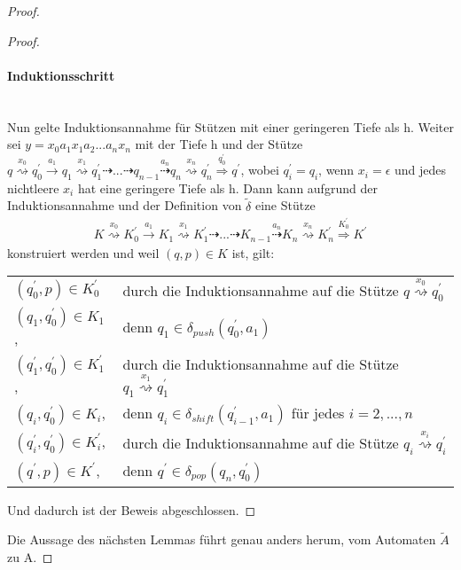 \begin{proof}
\begin{proof}
\paragraph{Induktionsschritt}\ \\
Nun gelte Induktionsannahme für Stützen mit einer geringeren Tiefe als h. Weiter sei $y = x_0a_1x_1a_2...a_nx_n$ mit der Tiefe h und der Stütze $q \stackrel{x_0}{\rightsquigarrow} q_0^{\prime} \stackrel{a_1}{\rightarrow} q_1\stackrel{x_1}{\rightsquigarrow} q_1^{\prime} \dashrightarrow ... \dashrightarrow q_{n-1} \stackrel{a_n}{\dashrightarrow} q_n \stackrel{x_n}{\rightsquigarrow} q_n^{\prime} \stackrel {q_0^{\prime}} {\Rightarrow} q^\prime$, wobei $q_i^\prime = q_i$, wenn $x_i = \epsilon$ und jedes nichtleere $x_i$ hat eine geringere Tiefe als h. Dann kann aufgrund der Induktionsannahme und der Definition von $\tilde{\delta}$ eine Stütze
\begin{eqnarray*}
K \stackrel{x_0}{\rightsquigarrow} K_0^{\prime} \stackrel{a_1}{\rightarrow} K_1\stackrel{x_1}{\rightsquigarrow} K_1^{\prime} \dashrightarrow ... \dashrightarrow K_{n-1} \stackrel{a_n}{\dashrightarrow} K_n \stackrel{x_n}{\rightsquigarrow} K_n^{\prime} \stackrel {K_0^{\prime}} {\Rightarrow} K^\prime 
\end{eqnarray*}
konstruiert werden und weil $(q,p) \in K$ ist, gilt:\\[1ex]
\begin{tabular}[c] {l l}
$(q_0^\prime, p) \in K_0^\prime $  & durch die Induktionsannahme auf die Stütze $q \stackrel{x_0}{\rightsquigarrow} q_0^\prime$ \\
$ (q_1, q_0^\prime) \in K_1$, & denn $q_1 \in \delta_{push}(q_0^\prime, a_1)$ \\
$(q_1^\prime, q_0^\prime) \in K_1^\prime$, & durch die Induktionsannahme auf die Stütze $q_1 \stackrel{x_1}{\rightsquigarrow} q_1^\prime$\\ 
$ (q_i, q_0^\prime) \in K_i$, & denn $q_i \in \delta_{shift}(q_{i-1}^\prime, a_1)$ für jedes $i=2,...,n$ \\
$(q_i^\prime, q_0^\prime) \in K_i^\prime$, & durch die Induktionsannahme auf die Stütze $q_i \stackrel{x_i}{\rightsquigarrow} q_i^\prime$\\ 
$ (q^\prime, p) \in K^\prime$, & denn $q^\prime \in \delta_{pop}(q_n, q_0^\prime)$ \\
\end{tabular}
Und dadurch ist der Beweis abgeschlossen.
\end{proof}
Die Aussage des nächsten Lemmas führt genau anders herum, vom Automaten $\tilde{A}$ zu A.

\end{proof}
